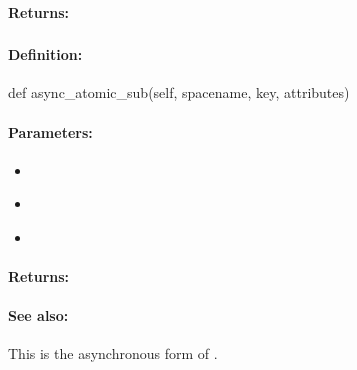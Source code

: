\paragraph{Returns:}


\pagebreak
\subsubsection{}
\label{api:python:async_atomic_sub}


\paragraph{Definition:}
\begin{pythoncode}
def async_atomic_sub(self, spacename, key, attributes)
\end{pythoncode}

\paragraph{Parameters:}
\begin{itemize}[noitemsep]
\item {}\\

\item {}\\

\item {}\\

\end{itemize}

\paragraph{Returns:}


\paragraph{See also:}  This is the asynchronous form of .

\pagebreak
\subsubsection{}
\label{api:python:uxact_atomic_sub}


